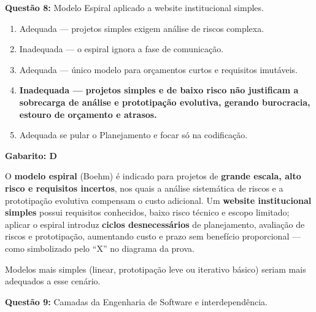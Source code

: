 \documentclass[12pt,a4paper]{article}
\begin{document}
\vspace{0.6cm}

\textbf{Questão 8:} Modelo Espiral aplicado a website institucional simples.

\begin{enumerate}[label=\textbf{\Alph*)}, itemsep=0.2cm]
    \item Adequada --- projetos simples exigem análise de riscos complexa.
    \item Inadequada --- o espiral ignora a fase de comunicação.
    \item Adequada --- único modelo para orçamentos curtos e requisitos imutáveis.
    \item[\textbf{D)}] \textbf{Inadequada --- projetos simples e de baixo risco não justificam a sobrecarga de análise e prototipação evolutiva, gerando burocracia, estouro de orçamento e atrasos.} \checkmark
    \item Adequada se pular o Planejamento e focar só na codificação.
\end{enumerate}

\begin{tcolorbox}[respostabox]
\textbf{Gabarito: D}

O \textbf{modelo espiral} (Boehm) é indicado para projetos de \textbf{grande escala, alto risco e requisitos incertos}, nos quais a análise sistemática de riscos e a prototipação evolutiva compensam o custo adicional. Um \textbf{website institucional simples} possui requisitos conhecidos, baixo risco técnico e escopo limitado; aplicar o espiral introduz \textbf{ciclos desnecessários} de planejamento, avaliação de riscos e prototipação, aumentando custo e prazo sem benefício proporcional --- como simbolizado pelo ``X'' no diagrama da prova.

Modelos mais simples (linear, prototipação leve ou iterativo básico) seriam mais adequados a esse cenário.
\end{tcolorbox}

\vspace{0.6cm}

\textbf{Questão 9:} Camadas da Engenharia de Software e interdependência.
\end{document}
